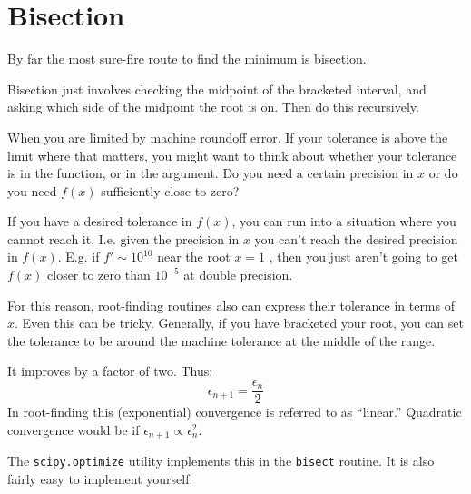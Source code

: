 \section{Bisection}

By far the most sure-fire route to find the minimum is bisection. 


\begin{answer}
Bisection just involves checking the midpoint of the bracketed
interval, and asking which side of the midpoint the root is on. Then
do this recursively.
\end{answer}


\begin{answer}
When you are limited by machine roundoff error. If your tolerance is
above the limit where that matters, you might want to think about
whether your tolerance is in the function, or in the argument. Do you
need a certain precision in $x$ or do you need $f(x)$ sufficiently
close to zero? 

If you have a desired tolerance in $f(x)$, you can run into a
situation where you cannot reach it. I.e. given the precision in $x$
you can't reach the desired precision in $f(x)$. E.g. if $f' \sim
10^{10}$ near the root $x=1$ , then you just aren't going to get
$f(x)$ closer to zero than $10^{-5}$ at double precision.

For this reason, root-finding routines also can express their
tolerance in terms of $x$. Even this can be tricky. Generally, if you
have bracketed your root, you can set the tolerance to be around the
machine tolerance at the middle of the range.
\end{answer}


\begin{answer}
  It improves by a factor of two. Thus:
  \begin{equation}
    \epsilon_{n+1} = \frac{\epsilon_n}{2}
  \end{equation}
  In root-finding this (exponential) convergence is referred to as
  ``linear.'' Quadratic convergence would be if $\epsilon_{n+1}\propto
  \epsilon_n^2$.
\end{answer}

The {\tt scipy.optimize} utility implements this in the {\tt bisect}
routine. It is also fairly easy to implement yourself.

